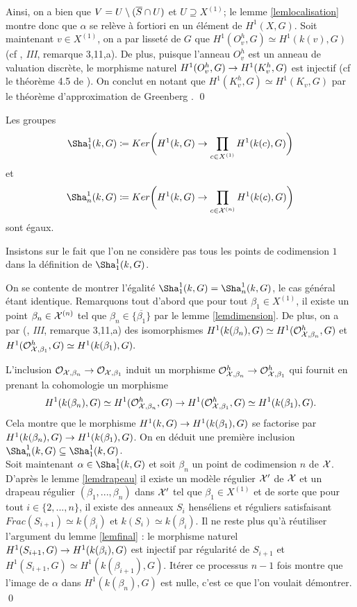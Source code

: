 \documentclass[11pt]{article}
\begin{document}
Ainsi, on a bien que $V = U \setminus (\overline{S} \cap U)$ et $U \supseteq X^{(1)}$; le lemme \ref{lemlocalisation} montre donc que $\alpha$ se relève à fortiori en un élément de $H^1(X,G)$. Soit maintenant $v \in X^{(1)}$, on a par lisseté de $G$ que $H^1(O_v^h,G) \simeq H^1(k(v),G)$ (cf \cite{Milne}, \textit{III}, remarque 3,11,a). De plus, puisque l'anneau $O_v^h$ est un anneau de valuation discrète, le morphisme naturel $H^1(O_v^h,G) \rightarrow H^1(K_v^h,G)$ est injectif (cf le théorème 4.5 de \cite{Nisnevich}). On conclut en notant que $H^1(K_v^h,G) \simeq H^1(K_v,G)$ par le théorème d'approximation de Greenberg \cite{Greenberg1966}.
\qed



\begin{prop}\label{prop1}
Les groupes 
$$
\Sha^1_1(k,G) \coloneqq Ker\bigg(H^1(k,G) \ra \prod_{{c \in X^{(1)}}}H^1(k(c),G) \bigg)
$$
et 
$$
\Sha^1_n(k,G) \coloneqq Ker\bigg(H^1(k,G) \ra \prod_{c \in \CX^{(n)}}H^1(k(c),G) \bigg)
$$
sont égaux.
\end{prop}

Insistons sur le fait que l'on ne considère pas tous les points de codimension $1$ dans la définition de $\Sha^1_1(k,G)$.

\proof On se contente de montrer l'égalité $\Sha^1_1(k,G) = \Sha^1_n(k,G)$, le cas général étant identique. Remarquons tout d'abord que pour tout  $\beta_1 \in X^{(1)}$, il existe un point $\beta_n \in \mathcal{X}^{(n)}$ tel que $\beta_n \in \overline{\{\beta_1\}}$ par le lemme \ref{lemdimension}. De plus, on a par (\cite{Milne}, \textit{III}, remarque 3,11,a) des isomorphismes $H^1(k(\beta_n),G) \simeq H^1(\mathcal{O}_{\mathcal{X},\beta_n}^h,G)$ et $H^1(\mathcal{O}_{\mathcal{X},\beta_1}^h,G) \simeq H^1(k(\beta_1),G).$

L'inclusion $\mathcal{O}_{\mathcal{X},\beta_n} \rightarrow \mathcal{O}_{\mathcal{X},\beta_1}$ induit un morphisme $\mathcal{O}_{\mathcal{X},\beta_n}^h \rightarrow \mathcal{O}_{\mathcal{X},\beta_1}^h$ qui fournit en prenant la cohomologie un morphisme
$$
H^1(k(\beta_n),G) \simeq H^1(\mathcal{O}_{\mathcal{X},\beta_n}^h,G) \rightarrow H^1(\mathcal{O}_{\mathcal{X},\beta_1}^h,G) \simeq H^1(k(\beta_1),G).
$$
Cela montre que le morphisme $H^1(k,G) \rightarrow H^1(k(\beta_1),G)$ se factorise par $H^1(k(\beta_n),G) \rightarrow H^1(k(\beta_1),G)$. On en déduit une première inclusion  $\Sha^1_n(k,G) \subseteq \Sha^1_1(k,G)$.\\

Soit maintenant $\alpha \in \Sha^1_1(k,G)$ et soit $\beta_n$ un point de codimension $n$ de $\mathcal{X}$. D'après le lemme \ref{lemdrapeau} il existe un modèle régulier $\mathcal{X}'$ de $\mathcal{X}$ et un drapeau régulier $(\beta_1,...,\beta_n)$ dans $\mathcal{X}'$ tel que $\beta_1 \in X^{(1)}$ et de sorte que pour tout $i \in \{2,...,n\}$, il existe des anneaux $S_i$ henséliens et réguliers satisfaisant $Frac(S_{i+1}) \simeq k(\beta_i)$ et $k(S_i) \simeq  k(\beta_i)$.
Il ne reste plus qu'à réutiliser l'argument du lemme \ref{lemfinal} : le morphisme naturel $H^1(S_{i+1},G) \rightarrow H^1(k(\beta_i),G)$ est injectif par régularité de $S_{i+1}$ et $H^1(S_{i+1},G) \simeq H^1(k(\beta_{i+1}),G)$. Itérer ce processus $n-1$ fois montre que l'image de $\alpha$ dans $H^1(k(\beta_n),G)$ est nulle, c'est ce que l'on voulait démontrer.
\qed \\
\end{document}
